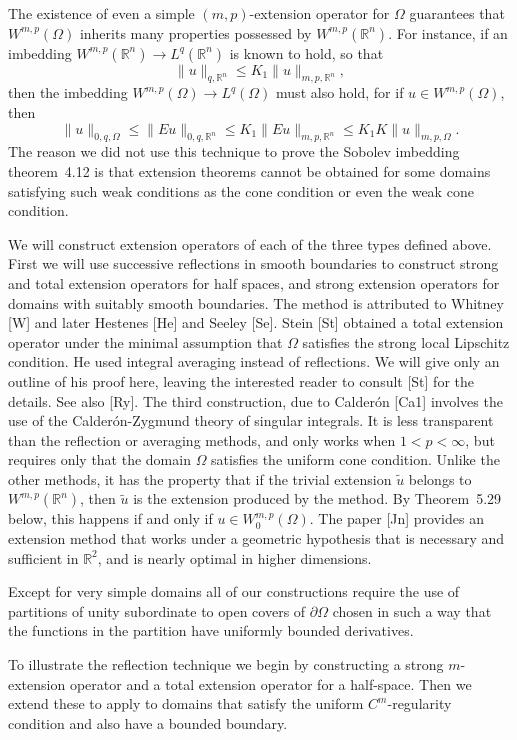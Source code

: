 \begin{para}
  The existence of even a simple $(m,p)$-extension operator for $\Omega$
  guarantees that $W^{m,p}(\Omega)$ inherits many properties possessed by
  $W^{m,p}(\mathbb{R}^n)$. For instance, if an imbedding $W^{m,p}(\mathbb{R}^n)
  \to L^q(\mathbb{R}^n)$ is known to hold, so that
  \[ \|u\|_{q,\mathbb{R}^n} \leq K_1 \|u\|_{m,p,\mathbb{R}^n}, \]
  then the imbedding $W^{m,p}(\Omega)\to L^q(\Omega)$ must also hold,
  for if $u\in W^{m,p}(\Omega)$, then
  \[ \|u\|_{0,q,\Omega} \leq \|Eu\|_{0,q,\mathbb{R}^n} \leq K_1 \|Eu\|_{m,p, \mathbb{R}^n}
      \leq K_1 K \|u\|_{m,p,\Omega}. \]
  The reason we did not use this technique to prove the Sobolev imbedding
  theorem~4.12 is that extension theorems cannot be obtained for some domains
  satisfying such weak conditions as the cone condition or even the weak cone
  condition.

  We will construct extension operators of each of the three types defined above.
  First we will use successive reflections in smooth boundaries to construct
  strong and total extension operators for half spaces, and strong extension
  operators for domains with suitably smooth boundaries. The method is attributed
  to Whitney [W] and later Hestenes [He] and Seeley [Se]. Stein [St] obtained
  a total extension operator under the minimal assumption that $\Omega$
  satisfies the strong local Lipschitz condition. He used integral averaging instead
  of reflections. We will give only an outline of his proof here, leaving the
  interested reader to consult [St] for the details. See also [Ry]. The third
  construction, due to Calder\'on [Ca1] involves the use of the Calder\'on-Zygmund
  theory of singular integrals. It is less transparent than the reflection or
  averaging methods, and only works when $1<p<\infty$, but requires only that the
  domain $\Omega$ satisfies the uniform cone condition. Unlike the other methods,
  it has the property that if the trivial extension $\tilde u$ belongs to
  $W^{m,p}(\mathbb{R}^n)$, then $\tilde u$ is the extension produced by the method.
  By Theorem~5.29 below, this happens if and only if $u\in W_0^{m,p}(\Omega)$.
  The paper [Jn] provides an extension method that works under a geometric hypothesis
  that is necessary and sufficient in $\mathbb{R}^2$, and is nearly optimal in
  higher dimensions.

  Except for very simple domains all of our constructions require the use of
  partitions of unity subordinate to open covers of $\partial\Omega$ chosen
  in such a way that the functions in the partition have uniformly bounded
  derivatives.

  To illustrate the reflection technique we begin by constructing a strong
  $m$-extension operator and a total extension operator for a half-space.
  Then we extend these to apply to domains that satisfy the uniform $C^m$-regularity
  condition and also have a bounded boundary.
\end{para}

